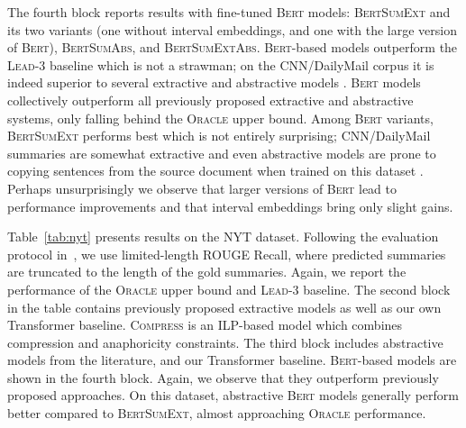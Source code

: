 \documentclass[11pt,a4paper]{article}
\begin{document}
    
    The fourth block reports results with fine-tuned \textsc{Bert} models:
    \textsc{BertSumExt} and its two variants  (one without interval
    embeddings, and one with the large version of \textsc{Bert}),
    \textsc{BertSumAbs}, and \textsc{BertSumExtAbs}.  \textsc{Bert}-based
    models outperform the \textsc{Lead}-3 baseline which is not a
    strawman; on the CNN/DailyMail corpus it is indeed superior to
    several extractive
    \cite{nallapati2017summarunner,narayan2018ranking,zhou2018neural} and
    abstractive models \cite{see-acl17}. \textsc{Bert} models collectively
    outperform all previously proposed extractive and abstractive systems,
    only falling behind the \textsc{Oracle} upper bound. Among
    \textsc{Bert} variants, \textsc{BertSumExt} performs best which is not
    entirely surprising; CNN/DailyMail summaries are somewhat extractive
    and even abstractive models are prone to copying sentences from the
    source document when trained on this dataset \cite{see-acl17}. Perhaps
    unsurprisingly we observe that larger versions of \textsc{Bert} lead
    to performance improvements and that interval embeddings bring only
    slight gains.
    


    Table~\ref{tab:nyt} presents results on the NYT dataset.  Following
    the evaluation protocol in~\citet{durrett2016learning}, we use
    limited-length ROUGE Recall, where predicted summaries are truncated
    to the length of the gold summaries.  Again, we report the performance
    of the \textsc{Oracle} upper bound and \textsc{Lead}-3 baseline. The
    second block in the table contains previously proposed extractive
    models as well as our own Transformer baseline. \textsc{Compress}
    \cite{durrett2016learning} is an ILP-based model which combines
    compression and anaphoricity constraints. The third block includes
    abstractive models from the literature, and our Transformer baseline.
    \textsc{Bert}-based models are shown in the fourth block. Again, we
    observe that they outperform previously proposed  approaches. On this dataset, abstractive \textsc{Bert}
    models generally perform better compared to \textsc{BertSumExt},
    almost approaching \textsc{Oracle} performance.
    
\end{document}
